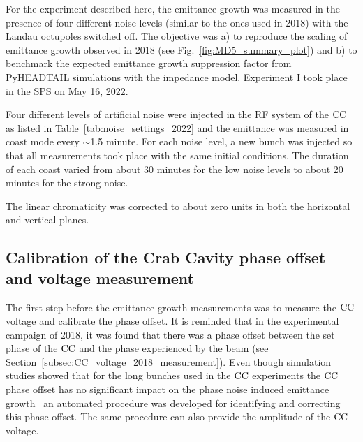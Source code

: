 For the experiment described here, the emittance growth was measured in the presence of four different noise levels (similar to the ones used in 2018) with the Landau octupoles switched off. The objective was a) to reproduce the scaling of emittance growth observed in 2018 (see Fig.~\ref{fig:MD5_summary_plot}) and b) to benchmark the expected emittance growth suppression factor from PyHEADTAIL simulations with the impedance model. Experiment I took place in the SPS on May 16, 2022.

Four different levels of artificial noise were injected in the RF system of the ${\mathrm{CC}}$ as listed in Table~\ref{tab:noise_settings_2022} and the emittance was measured in coast mode every $\sim$1.5 minute. For each noise level, a new bunch was injected so that all measurements took place with the same initial conditions. The duration of each coast varied from about 30 minutes for the low noise levels to about 20 minutes for the strong noise. 

The linear chromaticity was corrected to about zero units in both the horizontal and vertical planes. %

\subsection{Calibration of the Crab Cavity phase offset and voltage measurement}\label{subsec:cc_calibration_2022}

The first step before the emittance growth measurements was to measure the ${\mathrm{CC}}$ voltage and calibrate the phase offset. It is reminded that in the experimental campaign of 2018, it was found that there was a phase offset between the set phase of the ${\mathrm{CC}}$ and the phase experienced by the beam (see Section~\ref{subsec:CC_voltage_2018_measurement}). Even though simulation studies showed that for the long bunches used in the ${\mathrm{CC}}$ experiments the ${\mathrm{CC}}$ phase offset has no significant impact on the phase noise induced emittance growth~\cite{wp4_triantafyllou_2020} an automated procedure was developed for identifying and correcting this phase offset. The same procedure can also provide the amplitude of the ${\mathrm{CC}}$ voltage.

